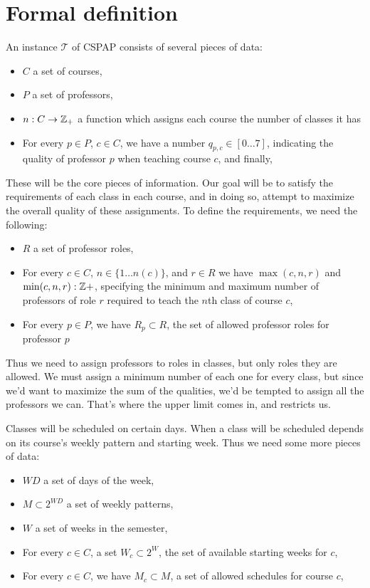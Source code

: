 \section{Formal definition}
An instance $\mathcal{T}$ of CSPAP consists of several pieces of data:

\begin{itemize}
\item $C$ a set of courses,
\item $P$ a set of professors,
\item $n: C \to \mathbb{Z}_+$ a function which assigns each course the number of classes it has
\item For every $p \in P$, $c \in C$, we have a number $q_{p, c} \in [0 \dots 7]$, indicating the quality of professor $p$ when teaching course $c$, and finally,
\end{itemize}

These will be the core pieces of information. Our goal will be to satisfy the requirements of each class in each course, and in doing so, attempt to maximize the overall quality of these assignments. To define the requirements, we need the following:
\begin{itemize}
\item $R$ a set of professor roles,
\item For every $c \in C$, $n \in \{1 \dots n(c)\}$, and $r \in R$ we have $\max(c, n, r)$ and $\min(c, n, r): \mathbb{Z}+$, specifying the minimum and maximum number of professors of role $r$ required to teach the $n$th class of course $c$,
\item For every $p \in P$, we have $R_p \subset R$, the set of allowed professor roles for professor $p$
\end{itemize}

Thus we need to assign professors to roles in classes, but only roles they are allowed. We must assign a minimum number of each one for every class, but since we'd want to maximize the sum of the qualities, we'd be tempted to assign all the professors we can. That's where the upper limit comes in, and restricts us.

Classes will be scheduled on certain days. When a class will be scheduled depends on its course's weekly pattern and starting week. Thus we need some more pieces of data:
\begin{itemize}
\item $WD$ a set of days of the week,
\item $M \subset 2^{WD}$ a set of weekly patterns,
\item $W$ a set of weeks in the semester,
\item For every $c \in C$, a set $W_c \subset 2^W$, the set of available starting weeks for $c$,
\item For every $c \in C$, we have $M_c \subset M$, a set of allowed schedules for course $c$,
\end{itemize}


